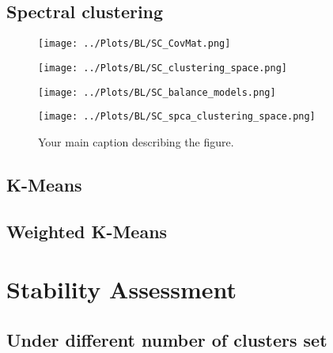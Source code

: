 \documentclass[12pt]{report} %
\begin{document}
\subsection{Spectral clustering}

\begin{figure}[ht]
  \centering

  \begin{minipage}{\textwidth}
    \centering
    \texttt{[image: ../Plots/BL/SC\_CovMat.png]}
    \subcaption{}
  \end{minipage}


  \begin{minipage}{\textwidth}
      \begin{minipage}[b]{0.5\textwidth}
          \centering
          \texttt{[image: ../Plots/BL/SC\_clustering\_space.png]}
          \subcaption{}
      \end{minipage}
      \begin{minipage}[b]{0.5\textwidth}
          \centering
          \texttt{[image: ../Plots/BL/SC\_balance\_models.png]}
          \subcaption{}
      \end{minipage}
  \end{minipage}


  \begin{minipage}{\textwidth}
      \centering
      \texttt{[image: ../Plots/BL/SC\_spca\_clustering\_space.png]}
      \subcaption{}
  \end{minipage}

  \caption{Your main caption describing the figure.}
\end{figure}

\subsection{K-Means}

\subsection{Weighted K-Means}

\section{Stability Assessment}

\subsection{Under different number of clusters set}
\end{document}
